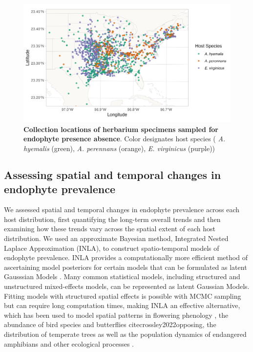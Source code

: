 \documentclass[11pt]{article}
\let\cite\citep
\begin{document}
\begin{figure}[h]
	\centering
	\includegraphics[width = \linewidth]{collections_map.png}
	\caption{\textbf{Collection locations of herbarium specimens sampled for endophyte presence absence}. Color designates host species ( \emph{A. hyemalis} (green), \emph{A. perennans} (orange), \emph{E. virginicus} (purple))}
\end{figure}


\subsection*{Assessing spatial and temporal changes in endophyte prevalence}
We assessed spatial and temporal changes in endophyte prevalence across each host distribution, first quantifying the long-term overall trends and then examining how these trends vary across the spatial extent of each host distribution.
We used an approximate Bayesian method, Integrated Nested Laplace Approximation (INLA), to construct spatio-temporal models of endophyte prevalence.
INLA provides a computationally more efficient method of ascertaining model posteriors for certain models that can be formulated as latent Gausssian Models \cite{rue2009approximate}. 
Many common statistical models, including structured and unstructured mixed-effects models, can be represented as latent Gaussian Models. 
Fitting models with structured spatial effects is possible with MCMC sampling but can require long computation times, making INLA an effective alternative, which has been used to model spatial patterns in flowering phenology \cite{willems2022forest}, the abundance of bird species \cite{meehan2019spatial} and butterflies cite{crossley2022opposing}, the distribution of temperate trees \cite{engel2022spatial} as well as the population dynamics of endangered amphibians \cite{knapp2016large} and other ecological processes \cite{beguin2012hierarchical}.
\end{document}
